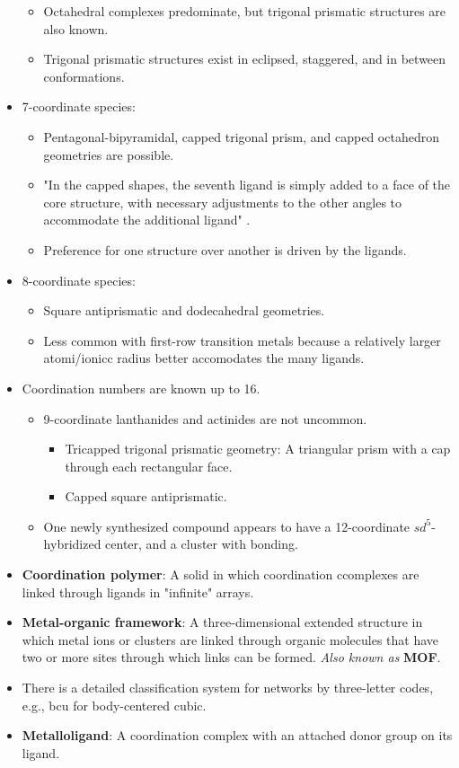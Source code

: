\documentclass[../notes.tex]{subfiles}
\begin{document}
\begin{itemize}
\begin{itemize}
        \item Octahedral complexes predominate, but trigonal prismatic structures are also known.
        \item Trigonal prismatic structures exist in eclipsed, staggered, and in between conformations.
    \end{itemize}
    \item 7-coordinate species:
    \begin{itemize}
        \item Pentagonal-bipyramidal, capped trigonal prism, and capped octahedron geometries are possible.
        \item "In the capped shapes, the seventh ligand is simply added to a face of the core structure, with necessary adjustments to the other angles to accommodate the additional ligand" \parencite[343]{bib:MiesslerFischerTarr}.
        \item Preference for one structure over another is driven by the ligands.
    \end{itemize}
    \item 8-coordinate species:
    \begin{itemize}
        \item Square antiprismatic and dodecahedral geometries.
        \item Less common with first-row transition metals because a relatively larger atomi/ionicc radius better accomodates the many ligands.
    \end{itemize}
    \item Coordination numbers are known up to 16.
    \begin{itemize}
        \item 9-coordinate lanthanides and actinides are not uncommon.
        \begin{itemize}
            \item Tricapped trigonal prismatic geometry: A triangular prism with a cap through each rectangular face.
            \item Capped square antiprismatic.
        \end{itemize}
        \item One newly synthesized compound appears to have a 12-coordinate $sd^5$-hybridized  center, and a cluster with  bonding.
    \end{itemize}
    \item \textbf{Coordination polymer}: A solid  in which coordination ccomplexes are linked through ligands in "infinite" arrays.
    \item \textbf{Metal-organic framework}: A three-dimensional extended structure in which metal ions or clusters are linked through organic molecules that have two or more sites through which links can be formed. \emph{Also known as} \textbf{MOF}.
    \item There is a detailed classification system for networks by three-letter codes, e.g., bcu for body-centered cubic.
    \item \textbf{Metalloligand}: A coordination complex with an attached donor group on its ligand.
\end{itemize}
\end{document}
